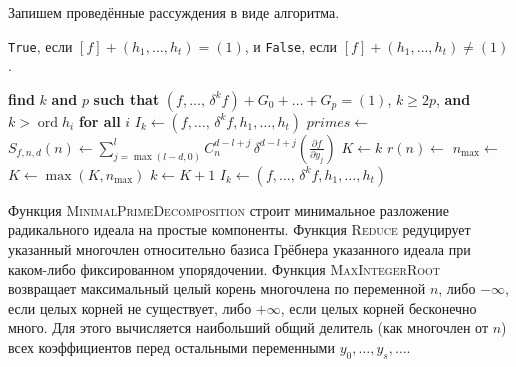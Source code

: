 \documentclass[11pt]{article}
\DeclareMathOperator{\ord}{ord}
\renewcommand{\ge}{\geqslant}
\theoremstyle{plain1}
\theoremstyle{plain2}
\theoremstyle{plain}
\theoremstyle{plain3}
\theoremstyle{definition}
\theoremstyle{remark}
\begin{document}
\bigskip

Запишем проведённые рассуждения в виде алгоритма.

\begin{algorithm}

 \verb'True', если  $[f]+(h_1,\ldots,h_t)=(1)$, и \verb'False', если $[f]+(h_1,\ldots,h_t)\ne(1)$.
\begin{algorithmic}[1]
\Statex
\State\label{find}{\bf{find}} $k$ {\bf and} $p$ {\bf such that} $(f, \ldots, \,\delta^k f) + G_0 + \ldots + G_p = (1)$, $k \ge 2p$, {\bf and} $k > \ord h_i$ {\bf for all} $i$
\State $I_k \gets (f, \ldots, \,\delta^k f, h_1, \ldots, h_t)$
  \label{subset}
  \EndIf
  \State\label{primes} $primes \gets$ 
  \State $S_{f,n,d}(n) \gets \sum_{j=\max(l-d,0)}^l C_{n}^{d-l+j} \,\delta^{d-l+j}\left(\frac{\partial f}{\partial y_{j}}\right)$
  \State $K \gets k$
    \State\label{remainder} $r(n) \gets$ 
    \State $n_{\max} \gets$ 
      \State\label{return_false} 
    \EndIf
    \State $K \gets \max(K, n_{\max})$
  \EndFor
  \State $k \gets K + 1$
  \State $I_k \gets (f, \ldots, \,\delta^k f, h_1, \ldots, h_t)$
\EndFor
\State {}
\end{algorithmic}
\end{algorithm}

Функция {\textsc{MinimalPrimeDecomposition}} строит минимальное разложение радикального идеала на простые компоненты.
Функция {\textsc{Reduce}} редуцирует указанный многочлен относительно базиса Грёбнера указанного идеала
при каком-либо фиксированном упорядочении.
Функция {\textsc{MaxIntegerRoot}} возвращает максимальный целый корень многочлена по переменной $n$,
либо $-\infty$, если целых корней не существует, либо $+\infty$, если целых корней бесконечно много.
Для этого вычисляется наибольший общий делитель (как многочлен от $n$) всех коэффициентов перед остальными переменными $y_0, \ldots, y_s, \ldots$.

\bigskip
\end{document}
